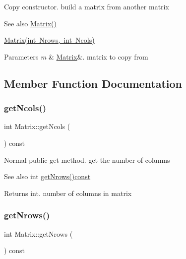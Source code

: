 Copy constructor. build a matrix from another matrix \begin{DoxySeeAlso}{See also}
\mbox{\hyperlink{class_matrix_a2dba13c45127354c9f75ef576f49269b}{Matrix()}} 

\mbox{\hyperlink{class_matrix_a135a15de1126d735bb95fcc839d739d7}{Matrix(int Nrows, int Ncols)}} 
\end{DoxySeeAlso}

\begin{DoxyParams}{Parameters}
{\em m} & \mbox{\hyperlink{class_matrix}{Matrix}}\&. matrix to copy from \\
\hline
\end{DoxyParams}


\subsection{Member Function Documentation}
\mbox{\label{class_matrix_ae0a5f2154953b8d129a90b04f91d9079}} 
\subsubsection{\texorpdfstring{get\+Ncols()}{getNcols()}}
{\footnotesize\ttfamily int Matrix\+::get\+Ncols (\begin{DoxyParamCaption}{ }\end{DoxyParamCaption}) const}

Normal public get method. get the number of columns \begin{DoxySeeAlso}{See also}
int \mbox{\hyperlink{class_matrix_a711f84a1c62832d9d197d78c9855a276}{get\+Nrows()const}} 
\end{DoxySeeAlso}
\begin{DoxyReturn}{Returns}
int. number of columns in matrix 
\end{DoxyReturn}
\mbox{\label{class_matrix_a711f84a1c62832d9d197d78c9855a276}} 
\subsubsection{\texorpdfstring{get\+Nrows()}{getNrows()}}
{\footnotesize\ttfamily int Matrix\+::get\+Nrows (\begin{DoxyParamCaption}{ }\end{DoxyParamCaption}) const}

